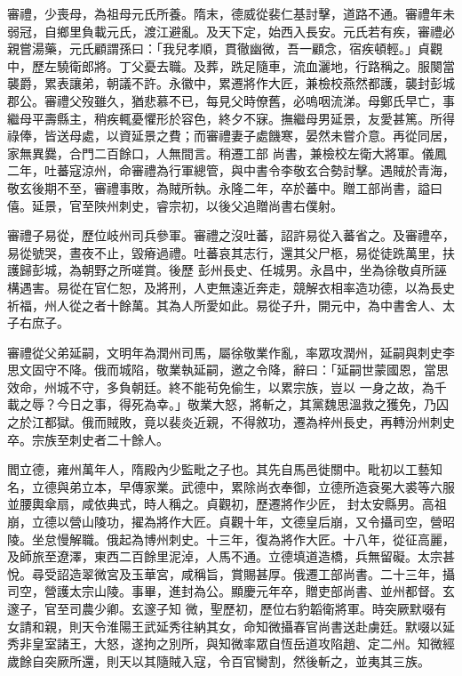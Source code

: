 \begin{pinyinscope}
 審禮，少喪母，為祖母元氏所養。隋末，德威從裴仁基討擊，道路不通。審禮年未弱冠，自鄉里負載元氏，渡江避亂。及天下定，始西入長安。元氏若有疾，審禮必親嘗湯藥，元氏顧謂孫曰：「我兒孝順，貫徹幽微，吾一顧念，宿疾頓輕。」貞觀
 中，歷左驍衛郎將。丁父憂去職。及葬，跣足隨車，流血灑地，行路稱之。服闋當襲爵，累表讓弟，朝議不許。永徽中，累遷將作大匠，兼檢校燕然都護，襲封彭城郡公。審禮父歿雖久，猶悲慕不已，每見父時僚舊，必嗚咽流涕。母鄭氏早亡，事繼母平壽縣主，稍疾輒憂懼形於容色，終夕不寐。撫繼母男延景，友愛甚篤。所得祿俸，皆送母處，以資延景之費；而審禮妻子處饑寒，晏然未嘗介意。再從同居，家無異爨，合門二百餘口，人無間言。稍遷工部
 尚書，兼檢校左衛大將軍。儀鳳二年，吐蕃寇涼州，命審禮為行軍總管，與中書令李敬玄合勢討擊。遇賊於青海，敬玄後期不至，審禮事敗，為賊所執。永隆二年，卒於蕃中。贈工部尚書，謚曰僖。延景，官至陜州刺史，睿宗初，以後父追贈尚書右僕射。



 審禮子易從，歷位岐州司兵參軍。審禮之沒吐蕃，詔許易從入蕃省之。及審禮卒，易從號哭，晝夜不止，毀瘠過禮。吐蕃哀其志行，還其父尸柩，易從徒跣萬里，扶護歸彭城，為朝野之所嗟賞。後歷
 彭州長史、任城男。永昌中，坐為徐敬貞所誣構遇害。易從在官仁恕，及將刑，人吏無遠近奔走，競解衣相率造功德，以為長史祈福，州人從之者十餘萬。其為人所愛如此。易從子升，開元中，為中書舍人、太子右庶子。



 審禮從父弟延嗣，文明年為潤州司馬，屬徐敬業作亂，率眾攻潤州，延嗣與刺史李思文固守不降。俄而城陷，敬業執延嗣，邀之令降，辭曰：「延嗣世蒙國恩，當思效命，州城不守，多負朝廷。終不能茍免偷生，以累宗族，豈以
 一身之故，為千載之辱？今日之事，得死為幸。」敬業大怒，將斬之，其黨魏思溫救之獲免，乃囚之於江都獄。俄而賊敗，竟以裴炎近親，不得敘功，遷為梓州長史，再轉汾州刺史卒。宗族至刺史者二十餘人。



 閻立德，雍州萬年人，隋殿內少監毗之子也。其先自馬邑徙關中。毗初以工藝知名，立德與弟立本，早傳家業。武德中，累除尚衣奉御，立德所造袞冕大裘等六服並腰輿傘扇，咸依典式，時人稱之。貞觀初，歷遷將作少匠，
 封太安縣男。高祖崩，立德以營山陵功，擢為將作大匠。貞觀十年，文德皇后崩，又令攝司空，營昭陵。坐怠慢解職。俄起為博州刺史。十三年，復為將作大匠。十八年，從征高麗，及師旅至遼澤，東西二百餘里泥淖，人馬不通。立德填道造橋，兵無留礙。太宗甚悅。尋受詔造翠微宮及玉華宮，咸稱旨，賞賜甚厚。俄遷工部尚書。二十三年，攝司空，營護太宗山陵。事畢，進封為公。顯慶元年卒，贈吏部尚書、並州都督。玄邃子，官至司農少卿。玄邃子知
 微，聖歷初，歷位右豹韜衛將軍。時突厥默啜有女請和親，則天令淮陽王武延秀往納其女，命知微攝春官尚書送赴虜廷。默啜以延秀非皇室諸王，大怒，遂拘之別所，與知微率眾自恆岳道攻陷趙、定二州。知微經歲餘自突厥所還，則天以其隨賊入寇，令百官臠割，然後斬之，並夷其三族。




\end{pinyinscope}
